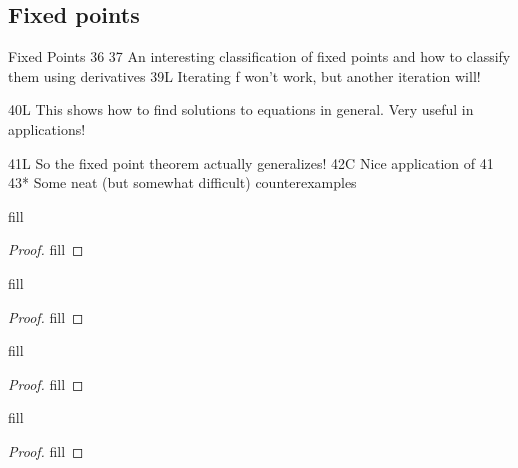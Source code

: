 \subsection{Fixed points}
 
Fixed Points
36
37 An interesting classification of fixed points and how to classify them using derivatives
39L Iterating f won't work, but another iteration will!

40L This shows how to find solutions to equations in general. Very useful in applications!

41L So the fixed point theorem actually generalizes!
42C Nice application of 41
43* Some neat (but somewhat difficult) counterexamples


\begin{exercise}{36}
fill
\end{exercise}
\begin{proof}
fill
\end{proof} 

\begin{exercise}{37}
fill
\end{exercise}
\begin{proof}
fill
\end{proof} 

\begin{exercise}{42}
fill
\end{exercise}
\begin{proof}
fill
\end{proof} 

\begin{exercise}{43}
fill
\end{exercise}
\begin{proof}
fill
\end{proof} 
